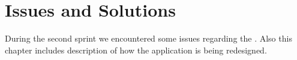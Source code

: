 
\chapter{Issues and Solutions}

During the second sprint we encountered some issues regarding the \gc. Also this chapter includes description of how the \ct application is being redesigned.








